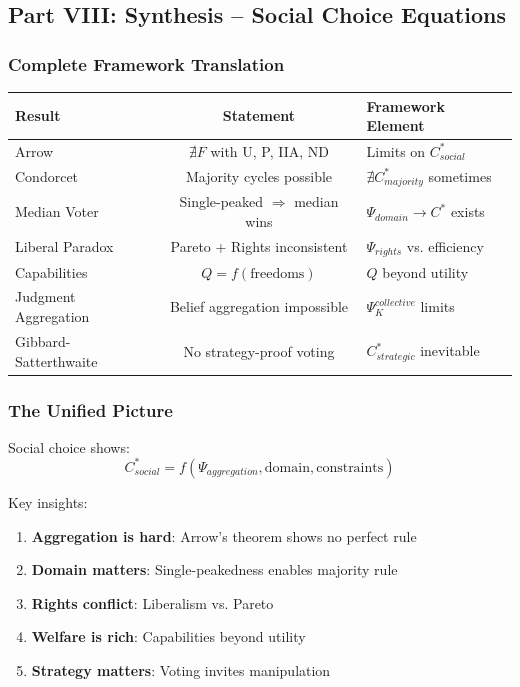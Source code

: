 \subsection{Part VIII: Synthesis – Social Choice Equations}

\subsubsection{Complete Framework Translation}

\begin{center}
\renewcommand{\arraystretch}{1.5}
\begin{tabular}{|l|c|l|}
\hline
\textbf{Result} & \textbf{Statement} & \textbf{Framework Element} \\
\hline
Arrow & $\nexists F$ with U, P, IIA, ND & Limits on $C^*_{social}$ \\
\hline
Condorcet & Majority cycles possible & $\nexists C^*_{majority}$ sometimes \\
\hline
Median Voter & Single-peaked $\Rightarrow$ median wins & $\Psi_{domain} \to C^*$ exists \\
\hline
Liberal Paradox & Pareto + Rights inconsistent & $\Psi_{rights}$ vs. efficiency \\
\hline
Capabilities & $Q = f(\text{freedoms})$ & $Q$ beyond utility \\
\hline
Judgment Aggregation & Belief aggregation impossible & $\Psi_K^{collective}$ limits \\
\hline
Gibbard-Satterthwaite & No strategy-proof voting & $C^*_{strategic}$ inevitable \\
\hline
\end{tabular}
\end{center}

\subsubsection{The Unified Picture}

Social choice shows:
\begin{equation}
\boxed{
C^*_{social} = f(\Psi_{aggregation}, \text{domain}, \text{constraints})
}
\end{equation}

Key insights:
\begin{enumerate}
    \item \textbf{Aggregation is hard}: Arrow's theorem shows no perfect rule
    \item \textbf{Domain matters}: Single-peakedness enables majority rule
    \item \textbf{Rights conflict}: Liberalism vs. Pareto
    \item \textbf{Welfare is rich}: Capabilities beyond utility
    \item \textbf{Strategy matters}: Voting invites manipulation
\end{enumerate}

